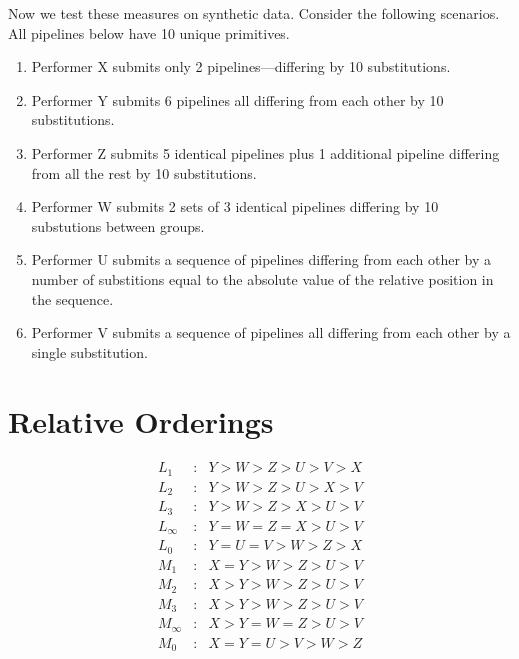 \documentclass{article}
\begin{document}
Now we test these measures on synthetic data.  Consider the following
scenarios.  All pipelines below have 10 unique primitives.
\begin{enumerate}
\item 
  Performer X submits only 2 pipelines---differing by 10 substitutions.
\item
  Performer Y submits 6 pipelines all differing from each other by 10
  substitutions.
\item
  Performer Z submits 5 identical pipelines plus 1 additional pipeline
  differing from all the rest by 10 substitutions.
\item
  Performer W submits 2 sets of 3 identical pipelines differing by 10
  substutions between groups.
\item
  Performer U submits a sequence of pipelines differing from each
  other by a number of substitions equal to the absolute value of the
  relative position in the sequence.
\item
  Performer V submits a sequence of pipelines all differing from each
  other by a single substitution.
\end{enumerate}

\section{Relative Orderings}

\begin{eqnarray}
  L_1 & : & Y > W > Z > U > V > X \\
  L_2 & : & Y > W > Z > U > X > V \\
  L_3 & : & Y > W > Z > X > U > V \\
  L_\infty & : & Y = W = Z = X > U > V \\
  L_0 & : & Y = U = V > W > Z > X \\
  M_1 & : & X = Y > W > Z > U > V \\
  M_2 & : & X > Y > W > Z > U > V \\
  M_3 & : & X > Y > W > Z > U > V \\
  M_\infty & : & X > Y = W = Z > U > V \\
  M_0 & : & X = Y = U > V > W > Z 
\end{eqnarray}
\end{document}
